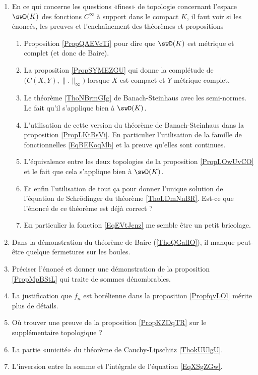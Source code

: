 \begin{enumerate}
        \item
            En ce qui concerne les questions «fines» de topologie concernant l'espace \( \swD(K)\) des fonctions \(  C^{\infty}\) à support dans le compact \( K\), il faut voir si les énoncés, les preuves et l'enchaînement des théorèmes et propositions
            \begin{enumerate}
                \item Proposition \ref{PropQAEVcTi} pour dire que \( \swD(K)\) est métrique et complet (et donc de Baire).
                \item La proposition \ref{PropSYMEZGU} qui donne la complétude de \( \big( C(X,Y),\| . \|_{\infty} \big)\) lorsque \( X\) est compact et \( Y\) métrique complet.
                \item Le théorème \ref{ThoNBrmGIg} de Banach-Steinhaus avec les semi-normes. Le fait qu'il s'applique bien à \( \swD(K)\).
                \item L'utilisation de cette version du théorème de Banach-Steinhaus dans la proposition \ref{PropLKtBsVi}. En particulier l'utilisation de la famille de fonctionnelles \eqref{EqBEKoqMb} et la preuve qu'elles sont continues.
                \item
                    L'équivalence entre les deux topologies de la proposition \ref{PropLOwUvCO} et le fait que cela s'applique bien à \( \swD(K)\).
                \item
                    Et enfin l'utilisation de tout ça pour donner l'unique solution de l'équation de Schrödinger du théorème \ref{ThoLDmNnBR}. Est-ce que l'énoncé de ce théorème est déjà correct ?
                \item
                    En particulier la fonction \eqref{EqEVtJcnz} me semble être un petit bricolage. 
            \end{enumerate}
    \item
        Dans la démonstration du théorème de Baire (\ref{ThoQGalIO}), il manque peut-être quelque fermetures sur les boules.
    \item
        Préciser l'énoncé et donner une démonstration de la proposition \ref{PropMpBStL} qui traite de sommes dénombrables.
    \item
        La justification que \( f_n\) est borélienne dans la proposition \ref{PropfqvLOl} mérite plus de détails.
    \item
        Où trouver une preuve de la proposition \ref{PropKZDqTR} sur le supplémentaire topologique ?
    \item
        La partie «unicité» du théorème de Cauchy-Lipschitz \ref{ThokUUlgU}.
    \item
        L'inversion entre la somme et l'intégrale de l'équation \eqref{EqXSgZGw}.
\end{enumerate}

